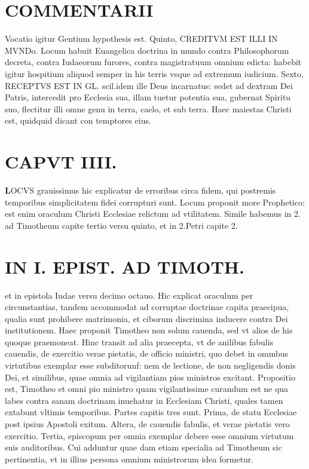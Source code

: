 \documentclass{article}
\begin{document}
\begin{pages}
\section*{COMMENTARII }
\marginpar{[ p.82 ]}\pstart Vocatio igitur Gentium hypothesis est.  \pend\pstart Quinto, CREDITVM EST ILLI IN MVNDo. Locum habuit Euangelica doctrina in mundo contra Philosophorum decreta, contra Iudaeorum furores, contra magistratuum omnium edicta: habebit igitur hospitium aliquod semper in his terris vsque ad extremum iudicium.  \pend\pstart Sexto, RECEPTVS EST IN GL. scil.idem ille Deus incarnatus: sedet ad dextram Dei Patris, intercedit pro Ecclesia sua, illam tuetur potentia sua, gubernat Spiritu suo, flectitur illi omne genu in terra, caelo, et sub terra. Haec maiestas Christi est, quidquid dicant con temptores eius.  \pend
\endnumbering\beginnumbering\section{CAPVT IIII.}\pstart \huge\textbf{L}\normalsize OCVS grauissimus hic explicatur de erroribus circa fidem, qui postremis temporibus simplicitatem fidei corrupturi sunt. Locum proponit more Prophetico: est enim oraculum Christi Ecclesiae relictum ad vtilitatem. Simile habemus in 2. ad Timotheum capite tertio versu quinto, et in 2.Petri capite 2.  \pend
\section*{IN I. EPIST. AD TIMOTH. }
\marginpar{[ p.83 ]}\pstart et in epistola Iudae versu decimo octauo. Hic explicat oraculum per circunstantias, tandem accommodat ad corruptae doctrinae capita praecipua, qualia sunt prohibere matrimonia, et ciborum discrimina inducere contra Dei institutionem.  \pend\pstart Haec proponit Timotheo non solum cauenda, sed vt alios de his quoque praemoneat. Hinc transit ad alia praecepta, vt de anilibus fabulis cauendis, de exercitio verae pietatis, de officio ministri, quo debet in ommbus virtutibus exemplar esse subditorunf: nem de lectione, de non negligendis donis Dei, et similibus, quae omnia ad vigilantiam pios ministros excitant.  \pend\pstart Propositio est, Timotheo et omni pio ministro quam vigilantissime curandum est ne qua labes contra sanam doctrinam inuehatur in Ecclesiam Christi, quales tamen extabunt vltimis temporibus.  \pend\pstart Partes capitis tres sunt. Prima, de statu Ecclesiae post ipsius Apostoli exitum. Altera, de cauendis fabulis, et verae pietatis vero exercitio. Tertia, episcopum per omnia exemplar debere esse omnium virtutum suis auditoribus. Cui adduntur quae dam etiam specialia ad Timotheum sic pertinentia, vt in illius persona omnium ministrorum idea formetur.  \pend

\end{pages}
\end{document}
